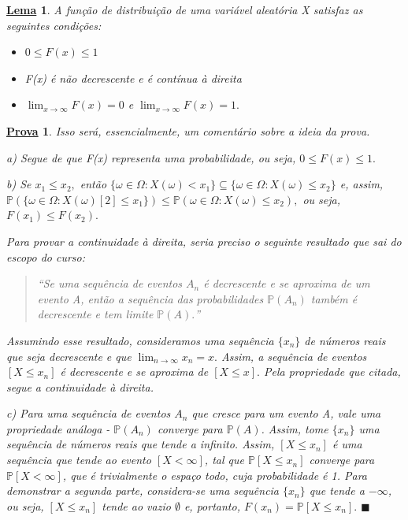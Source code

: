 \documentclass{article}
\newtheorem*{lemma*}{\underline{Lema}}
\newtheorem*{proof*}{\underline{Prova}}
\renewcommand\qedsymbol{$\blacksquare$}
\begin{document}
\begin{lemma*}
  A função de distribuição de uma variável aleatória X satisfaz as seguintes condições:
  \begin{itemize}
    \item[a)] \(0\leq F(x)\leq 1\)
    \item[b)] F(x) é não decrescente e é contínua à direita
    \item[c)] \(\lim_{x\to \infty}F(x) = 0\) e \(\lim_{x\to \infty}F(x) = 1.\)
  \end{itemize}
\end{lemma*}
\begin{proof*}
  Isso será, essencialmente, um comentário sobre a ideia da prova.

  a) Segue de que F(x) representa uma probabilidade, ou seja, \(0\leq F(x)\leq 1.\)

  b) Se \(x_{1}\leq x_{2},\) então \(\{\omega \in \Omega : X(\omega ) < x_{1}\}\subseteq{\{\omega \in \Omega : X(\omega )\leq x_{2}\}}\) e, assim, \(\mathbb{P}(\{\omega \in \Omega : X(\omega )[2]\leq x_{1}\})\leq 
  \mathbb{P}(\omega \in \Omega : X(\omega )\leq x_{2}),\) ou seja, \(F(x_{1})\leq F(x_{2}).\)

  Para provar a continuidade à direita, seria preciso o seguinte resultado que sai do escopo do curso:
  \begin{quote}
    ``Se uma sequência de eventos \(A_{n}\) é decrescente e se aproxima de um evento A, então a sequência
    das probabilidades \(\mathbb{P}(A_{n})\) também é decrescente e tem limite \(\mathbb{P}(A).\)''
  \end{quote}
  Assumindo esse resultado, consideramos uma sequência \(\{x_{n}\}\) de números reais que seja decrescente e que
  \(\lim_{n\to \infty}x_{n} = x.\)  Assim, a sequência de eventos \([X\leq x_{n}]\) é decrescente e se aproxima de \([X\leq x].\) 
  Pela propriedade que citada, segue a continuidade à direita.

  c) Para uma sequência de eventos \(A_{n}\) que cresce para um evento A, vale uma propriedade análoga - 
  \(\mathbb{P}(A_{n})\) converge para \(\mathbb{P}(A)\). Assim, tome \(\{x_{n}\}\) uma sequência de números reais
  que tende a infinito. Assim, \([X\leq x_{n}]\) é uma sequência que tende ao evento \([X < \infty]\), tal que \(\mathbb{P}[X\leq x_{n}]\) 
  converge para \(\mathbb{P}[X <\infty]\), que é trivialmente o espaço todo, cuja probabilidade é 1. Para demonstrar a segunda parte,
  considera-se uma sequência \(\{x_{n}\}\) que tende a \(-\infty\), ou seja, \([X\leq x_{n}]\) tende ao vazio \(\emptyset\) e, portanto,
  \(F(x_{n}) = \mathbb{P}[X\leq x_{n}].\) \qedsymbol
\end{proof*}
\end{document}
